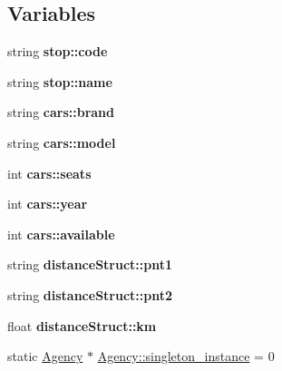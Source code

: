 \subsection*{Variables}
\begin{DoxyCompactItemize}
\item 
\mbox{\label{group___agency_ga79f9fc915ad09783ec07b876d6eed865}} 
string {\bfseries stop\+::code}
\item 
\mbox{\label{group___agency_ga91bd51eb4e3994056d52465dda3a6ca4}} 
string {\bfseries stop\+::name}
\item 
\mbox{\label{group___agency_ga604acdb12b949ce28b76c2e0cb29ad81}} 
string {\bfseries cars\+::brand}
\item 
\mbox{\label{group___agency_gaf0c7084b7a4fb4ceb5e74330e88d78bb}} 
string {\bfseries cars\+::model}
\item 
\mbox{\label{group___agency_gab4158f666bb1f7a8a1ca31f2942ba629}} 
int {\bfseries cars\+::seats}
\item 
\mbox{\label{group___agency_gacf7d9670242fa6da94168421f0317c08}} 
int {\bfseries cars\+::year}
\item 
\mbox{\label{group___agency_ga5fcd18c58d5dd4b65ffb25c6b3f5f088}} 
int {\bfseries cars\+::available}
\item 
\mbox{\label{group___agency_ga2e71e97640f5cc04c32d21c2d3104e06}} 
string {\bfseries distance\+Struct\+::pnt1}
\item 
\mbox{\label{group___agency_ga20809a497514156c21cac416a8714971}} 
string {\bfseries distance\+Struct\+::pnt2}
\item 
\mbox{\label{group___agency_ga41ee5fe344f1b745d3da6986449faa4f}} 
float {\bfseries distance\+Struct\+::km}
\item 
\mbox{\label{group___agency_ga24c6ae11e29cdf5eefc6a5c94783b90e}} 
static \hyperlink{class_agency}{Agency} $\ast$ \hyperlink{group___agency_ga24c6ae11e29cdf5eefc6a5c94783b90e}{Agency\+::singleton\+\_\+instance} = 0

\end{DoxyCompactItemize}
